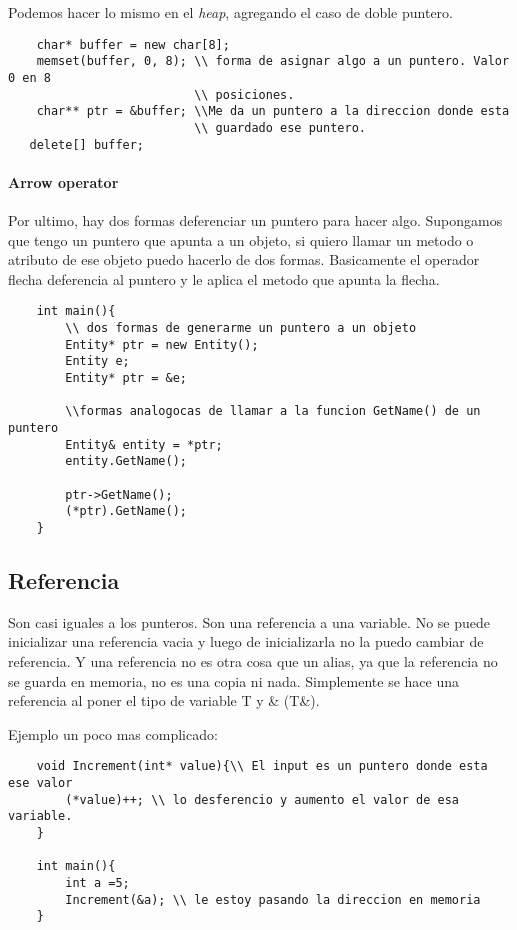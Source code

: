 \documentclass[11pt]{article}
\begin{document}
Podemos hacer lo mismo en el \textit{heap}, agregando el caso de doble puntero.
\begin{lstlisting}
    char* buffer = new char[8];
    memset(buffer, 0, 8); \\ forma de asignar algo a un puntero. Valor 0 en 8
                          \\ posiciones.
    char** ptr = &buffer; \\Me da un puntero a la direccion donde esta
                          \\ guardado ese puntero.
   delete[] buffer;
\end{lstlisting}

\paragraph{Arrow operator}
Por ultimo, hay dos formas deferenciar un puntero para hacer algo.
Supongamos que tengo un puntero que apunta a un objeto,
si quiero llamar un metodo o atributo de ese objeto puedo hacerlo de dos formas.
Basicamente el operador flecha deferencia al puntero y le aplica el metodo
que apunta la flecha.

\begin{lstlisting}
    int main(){
        \\ dos formas de generarme un puntero a un objeto
        Entity* ptr = new Entity();
        Entity e;
        Entity* ptr = &e;

        \\formas analogocas de llamar a la funcion GetName() de un puntero
        Entity& entity = *ptr;
        entity.GetName();

        ptr->GetName();
        (*ptr).GetName();
    }
\end{lstlisting}



\subsection{Referencia}
Son casi iguales a los punteros.
Son una referencia a una variable.
No se puede inicializar una referencia vacia y luego de inicializarla no la puedo
cambiar de referencia.
Y una referencia no es otra cosa que un alias, ya que la referencia no se guarda
en memoria, no es una copia ni nada.
Simplemente se hace una referencia al poner el tipo de variable T y \& (T\&).

Ejemplo un poco mas complicado:
\begin{lstlisting}
    void Increment(int* value){\\ El input es un puntero donde esta ese valor
        (*value)++; \\ lo desferencio y aumento el valor de esa variable.
    }

    int main(){
        int a =5;
        Increment(&a); \\ le estoy pasando la direccion en memoria
    }
\end{lstlisting}
\end{document}
